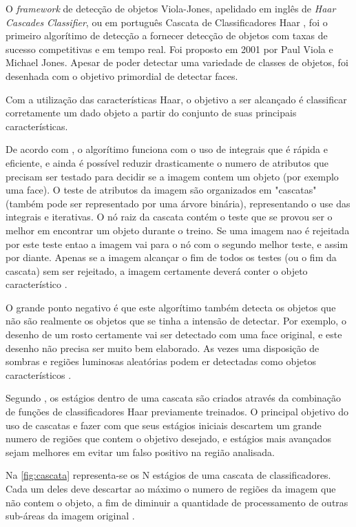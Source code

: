 O \textit{framework} de detecção de objetos Viola-Jones, apelidado em inglês de \textit{Haar Cascades Classifier}, ou em português Cascata de Classificadores Haar \cite{gustavo_cascata}, foi o primeiro algorítimo de detecção a fornecer detecção de objetos com taxas de sucesso competitivas e em tempo real. Foi proposto em 2001 por Paul Viola e Michael Jones. Apesar de poder detectar uma variedade de classes de objetos, foi desenhada com o objetivo primordial de detectar faces.

Com a utilização das características Haar, o objetivo a ser alcançado é classificar corretamente um dado objeto a partir do conjunto de suas principais características. 

De acordo com \cite{drmathew_java_programming}, o algorítimo funciona com o uso de integrais que é rápida e eficiente, e ainda é possível reduzir drasticamente o numero de atributos que precisam ser testado para decidir se a imagem contem um objeto (por exemplo uma face). O teste de atributos da imagem são organizados em "cascatas" (também pode ser representado por uma árvore binária), representando o use das integrais e  iterativas. O nó raiz da cascata contém o teste que se provou ser o melhor em encontrar um objeto durante o treino. Se uma imagem nao é rejeitada por este teste entao a imagem vai para o nó com o segundo melhor teste, e assim por diante. Apenas se a imagem alcançar o fim de todos os testes (ou o fim da cascata) sem ser rejeitado, a imagem certamente deverá conter o objeto característico .

O grande ponto negativo é que este algorítimo também detecta os objetos que não são realmente os objetos que se tinha a intensão de detectar\cite{drmathew_java_programming}. Por exemplo, o desenho de um rosto certamente vai ser detectado com uma face original, e este desenho não precisa ser muito bem elaborado. As vezes uma disposição de sombras e regiões luminosas aleatórias podem er detectadas como objetos característicos .

Segundo \cite{gustavo_cascata}, os estágios dentro de uma cascata são criados através da combinação de funções de classificadores Haar previamente treinados. O principal objetivo do uso de cascatas e fazer com que seus estágios iniciais descartem um grande numero de regiões que contem o objetivo desejado, e estágios mais avançados sejam melhores em evitar um falso positivo na região analisada. 

Na \autoref{fig:cascata} representa-se os N estágios de uma cascata de classificadores. Cada um deles deve descartar ao máximo o numero de regiões da imagem que não contem o objeto, a fim de diminuir a quantidade de processamento de outras sub-áreas da imagem original \cite{gustavo_cascata}.

